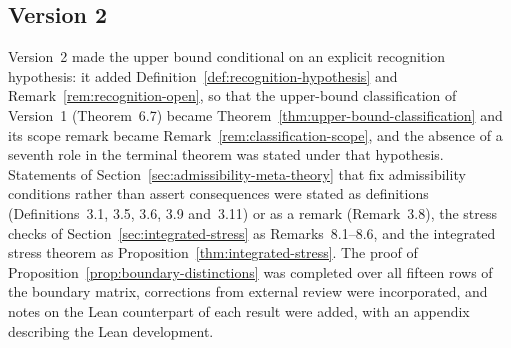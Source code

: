 \documentclass[11pt]{article}
\theoremstyle{definition}
\begin{document}
\subsection{Version 2}

Version~2 made the upper bound conditional on an explicit recognition
hypothesis: it added Definition~\ref{def:recognition-hypothesis} and
Remark~\ref{rem:recognition-open}, so that the upper-bound classification of
Version~1 (Theorem~6.7) became Theorem~\ref{thm:upper-bound-classification} and
its scope remark became Remark~\ref{rem:classification-scope}, and the absence
of a seventh role in the terminal theorem was stated under that hypothesis.
Statements of Section~\ref{sec:admissibility-meta-theory} that fix
admissibility conditions rather than assert consequences were stated as
definitions (Definitions~3.1, 3.5, 3.6, 3.9 and~3.11) or as a remark
(Remark~3.8), the stress checks of Section~\ref{sec:integrated-stress} as
Remarks~8.1--8.6, and the integrated stress theorem as
Proposition~\ref{thm:integrated-stress}. The proof of
Proposition~\ref{prop:boundary-distinctions} was completed over all fifteen
rows of the boundary matrix, corrections from external review were
incorporated, and notes on the Lean counterpart of each result were added,
with an appendix describing the Lean development.
 



\end{document}
